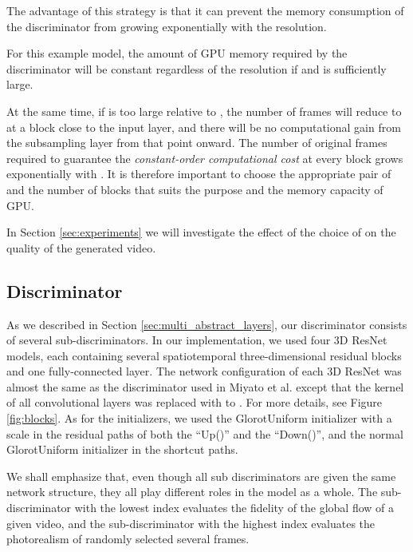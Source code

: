 \documentclass[twocolumn]{svjour3}
\def\Fig#1{Figure \ref{fig:#1}}
\def\Sec#1{Section \ref{sec:#1}}
\begin{document}
The advantage of this strategy is that it can prevent the memory consumption of the discriminator from growing exponentially with the resolution.


For this example model, the amount of GPU memory required by the discriminator will be constant regardless of the resolution if  and  is sufficiently large.

At the same time, if  is too large relative to , the number of frames will reduce to  at a block close to the input layer, and there will be no computational gain from the subsampling layer from that point onward.
The number of original frames required to guarantee the \textit{constant-order computational cost} at every block grows exponentially with .
It is therefore important to choose the appropriate pair of  and the number of blocks that suits the purpose and the memory capacity of GPU.

In \Sec{experiments} we will investigate the effect of the choice of  on the quality of the generated video.



\subsection{Discriminator}
\label{sec:discriminator}
As we described in \Sec{multi_abstract_layers}, our discriminator consists of
several sub-discriminators. In our implementation, we used four 3D ResNet models, each containing several spatiotemporal three-dimensional residual blocks \cite{Hara2018,He2016} and one fully-connected layer.
The network configuration of each 3D ResNet was almost the same as the discriminator used in Miyato et al. \cite{Miyato2018} except that the kernel of all convolutional layers was replaced with  to . For more details, see \Fig{blocks}.
As for the initializers, we used the GlorotUniform initializer \cite{Glorot2010} with a scale  in the residual paths of both the ``Up()'' and the ``Down()'', and the normal GlorotUniform initializer in the shortcut paths.

We shall emphasize that, even though all sub\discretionary{-}{-}{-}
discriminators are given the same network structure, they all play different roles in the model as a whole.
The sub-discriminator with the lowest index evaluates the fidelity of the global flow of a given video, and the sub-discriminator with the highest index evaluates the photorealism of randomly selected several frames.
\end{document}
